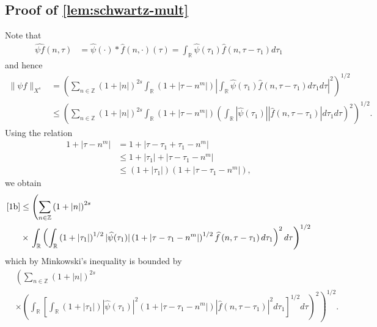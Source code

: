 \documentclass[12pt,reqno]{amsart}
\numberwithin{equation}{section}  %
\numberwithin{figure}{section}
\newcommand{\rr}{\mathbb{R}}
\newcommand{\zz}{\mathbb{Z}}
\newcommand{\wh}{\widehat}
\theoremstyle{plain}
\theoremstyle{definition}
\theoremstyle{remark}
\begin{document}
\subsection{Proof of \autoref{lem:schwartz-mult}}
Note that
%
%
\begin{equation*}
	\begin{split}
		\wh{\psi f}\left( n, \tau \right)
		& = \wh{\psi}(\cdot) * \wh{f}(n,
		\cdot)(\tau)
		= \int_\rr \wh{\psi}(\tau_1) \wh{f} \left( n, \tau - \tau_1 \right) 
		d\tau_1
	\end{split}
\end{equation*}
%
%
and hence
%
%
\begin{equation}
	\label{1b}
	\begin{split}
		\|\psi f\|_{X^s} 
		& = \left( \sum_{n \in \zz} \left (1 + |n| \right )^{2s} \int_\rr \left( 1 + | \tau -
		n^{m} | \right) | \int_\rr \wh{\psi}(\tau_1) \wh{f}\left( n, \tau -
		\tau_1
		\right)  d \tau_1 d \tau |^2 \right)^{1/2}
		\\
		& \le \left( \sum_{n \in \zz} \left (1 + |n| \right )^{2s} \int_\rr \left( 1 + | \tau -
		n^{m }
		|
		\right) \left( \int_\rr |\wh{\psi}\left( \tau_1 \right) | |\wh{f}\left( n,
		\tau - \tau_1
		\right) |  d \tau_1 d \tau \right)^2 \right)^{1/2}.
	\end{split}
\end{equation}
%
%
Using the relation
%
%
\begin{equation*}
	\begin{split}
		1 + | \tau - n^{m } |
    & = 1 + | \tau - \tau_1 + \tau_{1} - n^{m} |
		\\
		& \le 1 + | \tau_1 | + | \tau - \tau_1 - n^{m} |
		\\
		& \le \left( 1 + | \tau_1 | \right)\left( 1 + | \tau - \tau_1 -
		n^{m} | \right),
	\end{split}
\end{equation*}
%
%
we obtain
%
%
\begin{equation*}
	\begin{split}
		\eqref{1b}
		& \le \left( \sum_{n \in \zz} \left (1 + |n| \right )^{2s} \right.
		\\
		& \times \left . \int_\rr \left(
		\int_\rr \left( 1 + | \tau_1 | \right)^{1/2} | \wh{\psi}(\tau_1) |
		\left( 1 + | \tau - \tau_1 - n^{m} | \right)^{1/2} \wh{f}\left( n, \tau
		- \tau_1
		\right)d \tau_1
		\right)^2 d \tau \right)^{1/2}
	\end{split}
\end{equation*}
%
%
which by Minkowski's inequality is bounded by
%
%
\begin{equation}
	\label{2b}
	\begin{split}
		& \left( \sum_{n \in \zz} \left (1 + |n| \right )^{2s}  \right.
		\\
		& \times \left. \left( \int_\rr \left[ \int_\rr
		\left( 1 + | \tau_{1} | \right) | \wh{\psi}(\tau_1) |^2 \left( 1 + |
		\tau - \tau_1 - n^{m} |
		\right) | \wh{f}\left( n, \tau - \tau_1 \right) |^2 d \tau_1 
		\right]^{1/2} d \tau \right)^2 \right)^{1/2}.
	\end{split}
\end{equation}
\end{document}
